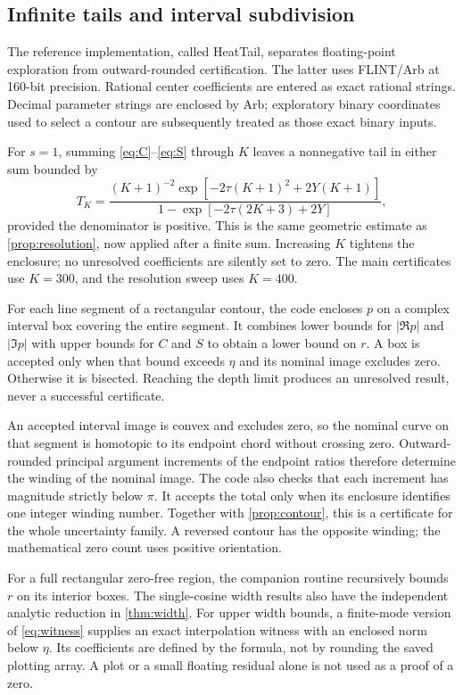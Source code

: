 \documentclass[11pt]{article}
\begin{document}
\subsection{Infinite tails and interval subdivision}
The reference implementation, called HeatTail, separates floating-point exploration from outward-rounded certification. The latter uses FLINT/Arb \cite{arb} at 160-bit precision. Rational center coefficients are entered as exact rational strings. Decimal parameter strings are enclosed by Arb; exploratory binary coordinates used to select a contour are subsequently treated as those exact binary inputs.

For $s=1$, summing \eqref{eq:C}--\eqref{eq:S} through $K$ leaves a nonnegative tail in either sum bounded by
\begin{equation}\label{eq:tailbound}
 T_K=\frac{(K+1)^{-2}\exp[-2\tau(K+1)^2+2Y(K+1)]}
 {1-\exp[-2\tau(2K+3)+2Y]},
\end{equation}
provided the denominator is positive. This is the same geometric estimate as \cref{prop:resolution}, now applied after a finite sum. Increasing $K$ tightens the enclosure; no unresolved coefficients are silently set to zero. The main certificates use $K=300$, and the resolution sweep uses $K=400$.

For each line segment of a rectangular contour, the code encloses $p$ on a complex interval box covering the entire segment. It combines lower bounds for $|\Re p|$ and $|\Im p|$ with upper bounds for $C$ and $S$ to obtain a lower bound on $r$. A box is accepted only when that bound exceeds $\eta$ and its nominal image excludes zero. Otherwise it is bisected. Reaching the depth limit produces an unresolved result, never a successful certificate.

An accepted interval image is convex and excludes zero, so the nominal curve on that segment is homotopic to its endpoint chord without crossing zero. Outward-rounded principal argument increments of the endpoint ratios therefore determine the winding of the nominal image. The code also checks that each increment has magnitude strictly below $\pi$. It accepts the total only when its enclosure identifies one integer winding number. Together with \cref{prop:contour}, this is a certificate for the whole uncertainty family. A reversed contour has the opposite winding; the mathematical zero count uses positive orientation.

For a full rectangular zero-free region, the companion routine recursively bounds $r$ on its interior boxes. The single-cosine width results also have the independent analytic reduction in \cref{thm:width}. For upper width bounds, a finite-mode version of \eqref{eq:witness} supplies an exact interpolation witness with an enclosed norm below $\eta$. Its coefficients are defined by the formula, not by rounding the saved plotting array. A plot or a small floating residual alone is not used as a proof of a zero.
\end{document}
